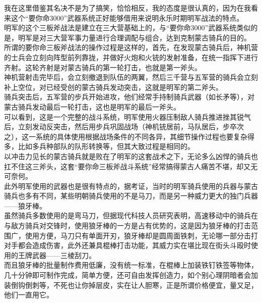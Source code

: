 \begin{multicols}{\theparacolNo}
我在这里借鉴其名决不是为了搞笑，恰恰相反，我的态度是很认真的，因为在我看来这个“要你命3000”武器系统正好能够借用来说明永乐时期明军战法的特点。\\

明军的这个三板斧战法是建立在三大营基础上的，与“要你命3000”武器系统类似的是，明军是对三大营军事力量进行合理调配与组合，达到克制蒙古骑兵的目的。\\

所谓的要你命三板斧战法的操作过程是这样的，首先，在发现蒙古骑兵后，神机营的士兵会立刻向阵型前列靠拢，并做好火炮和火铳的发射准备，在统一指挥下进行齐射。这轮齐射是对蒙古骑兵的第一轮打击，也就是第一斧头。\\

神机营射击完毕后，会立刻撤退到队伍的两翼，然后三千营与五军营的骑兵会立刻补上空位，对已经受创的蒙古骑兵发动突击，这就是明军的第二斧头。\\

骑兵突击后，五军营的步兵开始进攻，他们经常手持制骑兵武器（如长矛等），对蒙古骑兵发动最后一轮打击，这也是明军的最后一斧头。\\

可以看到，这是一个完整的战斗系统，明军使用火器压制敌人骑兵推进挫其锐气后，立刻发动反突击，然后用步兵巩固战场（神机铳居前，马队居后，步卒次之），这一系统的具体使用根据战场条件的不同各异，其细节操作过程也要复杂得多，比如多兵种部队的队形转换等，但其大致过程是相同的。\\

以冲击力见长的蒙古骑兵就是败在了明军的这套战术之下，无论多么凶悍的骑兵也扛不住这三斧头，这套“要你命三板斧战斗系统”经常搞得蒙古人痛苦不堪，却又无可奈何。\\

此外明军使用的武器也是很有特点的，据考证，当时的明军骑兵使用的兵器与蒙古骑兵也多有不同，某些明朝骑兵使用的不是马刀，而是另一种威力更大的独门兵器——狼牙棒。\\

虽然骑兵多数使用的是弯马刀，但据现代科技人员研究表明，高速移动中的骑兵在与敌方骑兵对交锋时，使用狼牙棒的一方是占有优势的，这是因为狼牙棒的打击范围广，使用方便，马刀只有单面开刃，狼牙棒却是圆周面铁刺，无论哪一部分击打对手都会造成伤害，此外还兼具棍棒打击功能，其威力实在堪比现在街头斗殴时使用的王牌武器——三棱刮刀。\\

而且狼牙棒的批量制作费用低廉，没有统一标准，在棍棒上加装铁钉铁签等物体，几十分钟即可制作完成，简单方便，还可自由发挥创造力，如个别心理阴暗者会加装倒钩倒刺等，不死也让你掉层皮，实在让人胆寒，正是所谓价格便宜，量又足，他们一直用它。\\


\end{multicols}
